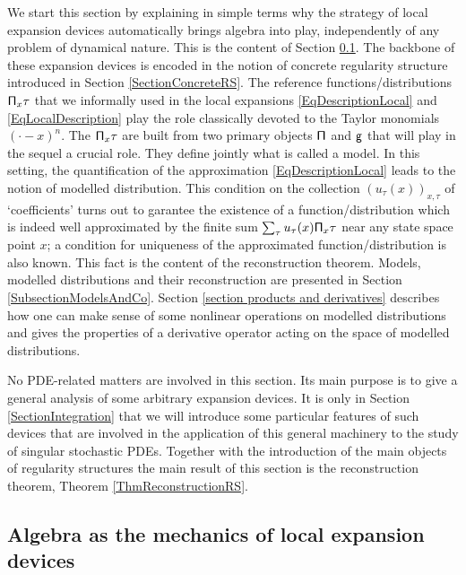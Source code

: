 \documentclass[10pt, reqno]{amsart}
\numberwithin{subsection}{section}
\numberwithin{subsubsection}{subsection}
\numberwithin{equation}{section} %
\theoremstyle{mystyle}
\theoremstyle{mystyle2}
\theoremstyle{mystyle3}
\begin{document}
We start this section by explaining in simple terms why the strategy of local expansion devices automatically brings algebra into play, independently of any problem of dynamical nature. This is the content of Section \ref{SectionLocalExpansionDevices}. The backbone of these expansion devices is encoded in the notion of concrete regularity structure introduced in Section \ref{SectionConcreteRS}. The reference functions/distributions ${\sf \Pi}_x\tau$ that we informally used in the local expansions \eqref{EqDescriptionLocal} and \eqref{EqLocalDescription} play the role classically devoted to the Taylor monomials $(\cdot-x)^n$. The ${\sf \Pi}_x\tau$ are built from two primary objects $\sf \Pi$ and $\sf g$ that will play in the sequel a crucial role. They define jointly what is called a model. In this setting, the quantification of the approximation \eqref{EqDescriptionLocal} leads to the notion of modelled distribution. This condition on the collection $(u_\tau(x))_{x,\tau}$ of `coefficients' turns out to garantee the existence of a function/distribution which is indeed well approximated by the finite sum $\sum_\tau u_\tau(x) {\sf \Pi}_x\tau$ near any state space point $x$; a condition for uniqueness of the approximated function/distribution is also known. This fact is the content of the reconstruction theorem. Models, modelled distributions and their reconstruction are presented in Section \ref{SubsectionModelsAndCo}. Section \ref{section products and derivatives} describes how one can make sense of some nonlinear operations on modelled distributions and gives the properties of a derivative operator acting on the space of modelled distributions. 

No PDE-related matters are involved in this section. Its main purpose is to give a general analysis of some arbitrary expansion devices. It is only in Section \ref{SectionIntegration} that we will introduce some particular features of such devices that are involved in the application of this general machinery to the study of singular stochastic PDEs. Together with the introduction of the main objects of regularity structures the main result of this section is the reconstruction theorem, Theorem \ref{ThmReconstructionRS}.



\bigskip


\subsection{Algebra as the mechanics of local expansion devices}
\label{SectionLocalExpansionDevices}
\end{document}
